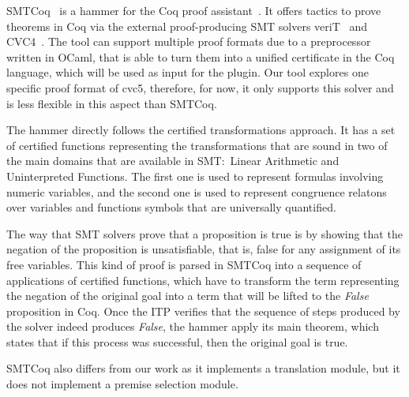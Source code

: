SMTCoq~\cite{smtcoq} is a hammer for the Coq proof assistant~\cite{Bertot2004}.
It offers tactics to prove theorems in Coq via the external proof-producing SMT
solvers veriT~\cite{Bouton2009} and CVC4~\cite{Barrett2011}. The tool can support multiple proof formats
due to a preprocessor written in OCaml, that is able to turn them
into a unified certificate in the Coq language,
which will be used as input for the plugin. Our tool explores one specific
proof format of cvc5, therefore, for now, it only supports this solver and is
less flexible in this aspect than SMTCoq.

The hammer directly follows the certified transformations approach.
It has a set of certified functions representing the transformations
that are sound in two of the main domains that are available in SMT:\
Linear Arithmetic and Uninterpreted Functions. The first one is used to
represent formulas involving numeric variables, and the second one is
used to represent congruence relatons over variables and functions symbols
that are universally quantified.

The way that SMT solvers prove
that a proposition is true is by showing that the negation of the proposition is unsatisfiable,
that is, false for any assignment of its free variables. This kind of proof
is parsed in SMTCoq into a sequence of applications of certified functions, which have
to transform the term representing the negation of the original goal into a
term that will be lifted to the \textit{False} proposition in Coq. Once the
ITP verifies that the sequence of steps produced by the solver indeed
produces \textit{False}, the hammer apply its main theorem, which states that if
this process was successful, then the original goal is true.

SMTCoq also differs from our work as it implements a translation module, but
it does not implement a premise selection module.
